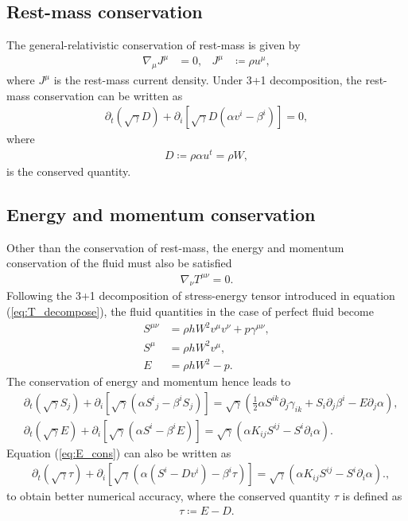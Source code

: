\subsection{Rest-mass conservation}
\label{section2.1.2}
The general-relativistic conservation of rest-mass is given by
\begin{align}
    \nabla_\mu J^\mu &= 0, & J^\mu &\coloneqq \rho u^\mu,
\end{align}
where $J^\mu$ is the rest-mass current density.
Under 3+1 decomposition, the rest-mass conservation can be written as
\begin{align}\label{eq:mass_cons}
    \partial_t \left(\sqrt{\gamma}D\right) + \partial_i \left[\sqrt{\gamma} D \left(\alpha v^i - \beta^i \right) \right] = 0,
\end{align}
where
\begin{align}
    D \coloneqq \rho \alpha u^t = \rho W,
\end{align}
is the conserved quantity.

\subsection{Energy and momentum conservation}
\label{section2.1.3}
Other than the conservation of rest-mass, the energy and momentum conservation of the fluid must also be satisfied
\begin{align}
    \nabla_\nu T^{\mu\nu} = 0.
\end{align}
Following the 3+1 decomposition of stress-energy tensor introduced in equation (\ref{eq:T_decompose}),
the fluid quantities in the case of perfect fluid become
\begin{align}
    S^{\mu\nu} &= \rho h W^2 v^\mu v^\nu + p \gamma^{\mu\nu}, \\
    S^\mu &= \rho h W^2 v^\mu, \\
    E &= \rho h W^2 - p.
\end{align}
The conservation of energy and momentum hence leads to
\begin{align}
    &\partial_t \left( \sqrt{\gamma} S_j \right) + \partial_i \left[\sqrt{\gamma} \left(\alpha S^i{}_j - \beta^i S_j\right) \right]
    = \sqrt{\gamma} \left(\frac{1}{2} \alpha S^{ik} \partial_j \gamma_{ik} + S_i \partial_j \beta^i - E \partial_j \alpha\right), \label{eq:mom_cons} \\
    &\partial_t \left( \sqrt{\gamma} E \right) + \partial_i \left[ \sqrt{\gamma} \left(\alpha S^i - \beta^i E \right) \right]
    = \sqrt{\gamma} \left(\alpha K_{ij} S^{ij} - S^i \partial_i \alpha \right). \label{eq:E_cons}
\end{align}
Equation (\ref{eq:E_cons}) can also be written as
\begin{align}
    &\partial_t \left( \sqrt{\gamma} \tau \right) + \partial_i \left[\sqrt{\gamma} \left(\alpha\left(S^i - D v^i \right) - \beta^i \tau \right)\right]
    = \sqrt{\gamma} \left(\alpha K_{ij} S^{ij} - S^i \partial_i \alpha \right). \label{eq:tau_cons},
\end{align}
to obtain better numerical accuracy,
where the conserved quantity $\tau$ is defined as
\begin{align}
    \tau \coloneqq E - D.
\end{align}

